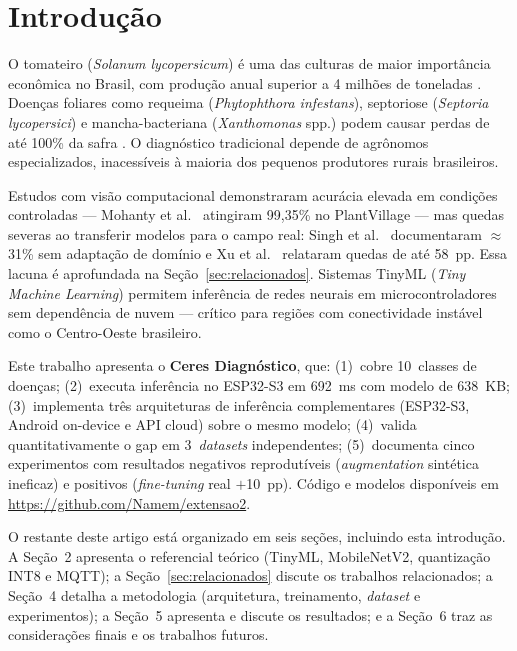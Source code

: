 \documentclass[12pt]{article}
\begin{document}
\section{Introdução}

O tomateiro (\textit{Solanum lycopersicum}) é uma das culturas de maior importância
econômica no Brasil, com produção anual superior a 4 milhões de toneladas
\cite{fao2024}. Doenças foliares como requeima (\textit{Phytophthora infestans}),
septoriose (\textit{Septoria lycopersici}) e mancha-bacteriana (\textit{Xanthomonas}
spp.) podem causar perdas de até 100\% da safra \cite{embrapa2023}. O diagnóstico
tradicional depende de agrônomos especializados, inacessíveis à maioria dos pequenos
produtores rurais brasileiros.

Estudos com visão computacional demonstraram acurácia elevada em condições
controladas --- Mohanty et al.~\cite{mohanty2016} atingiram 99,35\% no PlantVillage
--- mas quedas severas ao transferir modelos para o campo real: Singh et
al.~\cite{singh2020} documentaram $\approx$31\% sem adaptação de domínio e Xu et
al.~\cite{xu2024} relataram quedas de até 58~pp. Essa lacuna é aprofundada na
Seção~\ref{sec:relacionados}. Sistemas TinyML (\textit{Tiny Machine Learning})
permitem inferência de redes neurais em microcontroladores sem dependência de nuvem
\cite{warden2019} --- crítico para regiões com conectividade instável como o
Centro-Oeste brasileiro.

Este trabalho apresenta o \textbf{Ceres Diagnóstico}, que: (1)~cobre 10~classes de
doenças; (2)~executa inferência no ESP32-S3 em 692~ms com modelo de 638~KB;
(3)~implementa três arquiteturas de inferência complementares (ESP32-S3, Android
on-device e API cloud) sobre o mesmo modelo; (4)~valida quantitativamente o gap em
3~\textit{datasets} independentes; (5)~documenta cinco experimentos com resultados
negativos reprodutíveis (\textit{augmentation} sintética ineficaz) e positivos
(\textit{fine-tuning} real $+$10~pp). Código e modelos disponíveis em
\url{https://github.com/Namem/extensao2}.

O restante deste artigo está organizado em seis seções, incluindo esta introdução.
A Seção~2 apresenta o referencial teórico (TinyML, MobileNetV2, quantização INT8 e
MQTT); a Seção~\ref{sec:relacionados} discute os trabalhos relacionados; a Seção~4
detalha a metodologia (arquitetura, treinamento, \textit{dataset} e experimentos);
a Seção~5 apresenta
e discute os resultados; e a Seção~6 traz as considerações finais e os trabalhos
futuros.
\end{document}

